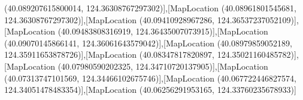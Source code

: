 (40.089207615800014, 124.36308767297302)],[MapLocation (40.08961801545681, 124.36308767297302)],[MapLocation (40.09410928967286, 124.36537237052109)],[MapLocation (40.09483808316919, 124.36435007073915)],[MapLocation (40.09070145866141, 124.36061643579042)],[MapLocation (40.08979859052189, 124.35911653878726)],[MapLocation (40.08347817820897, 124.35021160485782)],[MapLocation (40.07980590202325, 124.34710720137905)],[MapLocation (40.07313747101569, 124.34466102675746)],[MapLocation (40.067722446827574, 124.34051478483354)],[MapLocation (40.06256291953165, 124.33760235678933)]